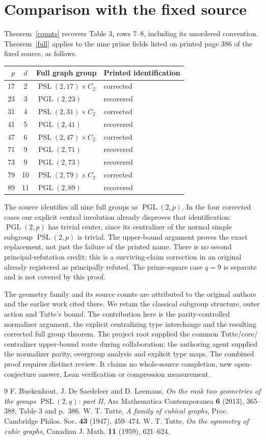 \documentclass[11pt]{article}
\newcommand{\PSL}{\operatorname{PSL}}
\newcommand{\PGL}{\operatorname{PGL}}
\begin{document}
\section{Comparison with the fixed source}
Theorem~\ref{counts} recovers Table 3, rows 7--8, including its
unordered convention. Theorem~\ref{full} applies to the nine prime
fields listed on printed page 386 of the fixed source, as follows.
\begin{center}
\begin{tabular}{rcll}
\toprule
$p$&$d$&Full graph group&Printed identification\\\midrule
17&2&$\PSL(2,17)\times C_2$&corrected\\
23&3&$\PGL(2,23)$&recovered\\
31&4&$\PSL(2,31)\times C_2$&corrected\\
41&5&$\PGL(2,41)$&recovered\\
47&6&$\PSL(2,47)\times C_2$&corrected\\
71&9&$\PGL(2,71)$&recovered\\
73&9&$\PGL(2,73)$&recovered\\
79&10&$\PSL(2,79)\times C_2$&corrected\\
89&11&$\PGL(2,89)$&recovered\\\bottomrule
\end{tabular}
\end{center}
The source identifies all nine full groups as $\PGL(2,p)$. In the
four corrected cases our explicit central involution already disproves
that identification: $\PGL(2,p)$ has trivial center, since its
centralizer of the normal simple subgroup $\PSL(2,p)$ is trivial.
The upper-bound argument proves the exact replacement, not just the
failure of the printed name. There is no second principal-refutation
credit: this is a surviving-claim correction in an original already
registered as principally refuted. The prime-square case $q=9$ is
separate and is not covered by this proof.

The geometry family and its source counts are attributed to the
original authors and the earlier work cited there. We retain the
classical subgroup structure, outer action and Tutte's bound. The
contribution here is the parity-controlled normalizer argument, the
explicit centralizing type interchange and the resulting corrected full
group theorem. The project root supplied the common Tutte/core/
centralizer upper-bound route during collaboration; the authoring
agent supplied the normalizer parity, overgroup analysis and explicit
type maps. The combined proof requires distinct review. It claims no
whole-source completion, new open-conjecture answer, Lean verification
or compression measurement.

\begin{thebibliography}{9}
 F. Buekenhout, J. De Saedeleer and D. Leemans,
\emph{On the rank two geometries of the groups $\PSL(2,q)$: part II},
Ars Mathematica Contemporanea \textbf{6} (2013), 365--388,
Table 3 and p.~386.
 W. T. Tutte, \emph{A family of cubical graphs},
Proc. Cambridge Philos. Soc. \textbf{43} (1947), 459--474.
 W. T. Tutte, \emph{On the symmetry of cubic graphs},
Canadian J. Math. \textbf{11} (1959), 621--624.
\end{thebibliography}
\end{document}

